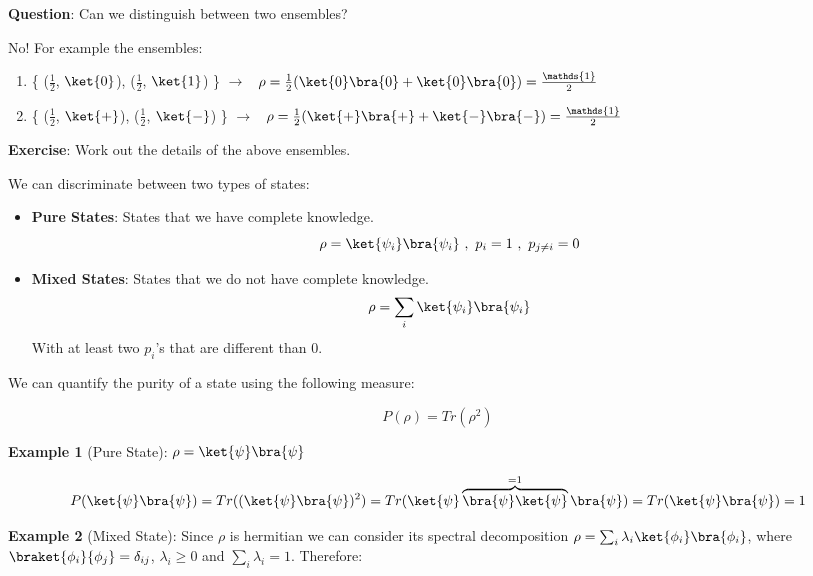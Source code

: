 \textbf{Question}: Can we distinguish between two ensembles? 
 

No! For example the ensembles: 
\begin{enumerate}
    \item \{ ($\frac{1}{2}$, $\ket{0}$), ($\frac{1}{2}$, $\ket{1}$)  \} $\rightarrow$ \ $\rho = \frac{1}{2}( \ket{0} \bra{0} + \ket{0} \bra{0}) = \frac{\mathds{1}}{2}$ 
    \item \{ ($\frac{1}{2}$, $\ket{+}$), ($\frac{1}{2}$, $\ket{-}$)  \} $\rightarrow$ \ $\rho = \frac{1}{2}( \ket{+} \bra{+} + \ket{-} \bra{-}) = \frac{\mathds{1}}{2}$ 
\end{enumerate}
 
\textbf{Exercise}: Work out the details of the above ensembles.
 
We can discriminate between two types of states:

\begin{itemize}
    \item \textbf{Pure States}: States that we have complete knowledge.
    \begin{equation}
        \rho = \ket{\psi_i} \bra{\psi_i} \ , \ p_i =1 \ , \ p_{j \neq i} = 0
    \end{equation}
    \item \textbf{Mixed States}: States that we do not have complete knowledge.
    \begin{equation}
        \rho = \sum_i \ket{\psi_i} \bra{\psi_i} 
    \end{equation}
    With at least two $p_i$'s that are different than 0.
\end{itemize}

We can quantify the purity of a state using the following measure:

\begin{equation}
    P(\rho) = Tr(\rho^2)
\end{equation}

\textbf{Example 1} (Pure State): $\rho = \ket{\psi} \bra{\psi}$

\begin{equation}
    P( \ket{\psi} \bra{\psi} ) = Tr( (\ket{\psi} \bra{\psi}) ^2) = Tr( \ket{\psi} \overbrace{\bra{\psi} \ket{\psi}}^{=1} \bra{\psi}) = Tr( \ket{\psi} \bra{\psi} ) = 1
\end{equation}

 

\textbf{Example 2} (Mixed State): Since $\rho$ is hermitian we can consider its spectral decomposition $ \rho = \sum_i \lambda_i \ket{\phi_i} \bra{\phi_i} $, where $\braket{\phi_i}{\phi_j} = \delta_{ij}$, $\lambda_i \geq 0$ and $\sum_i \lambda_i = 1$. Therefore:


